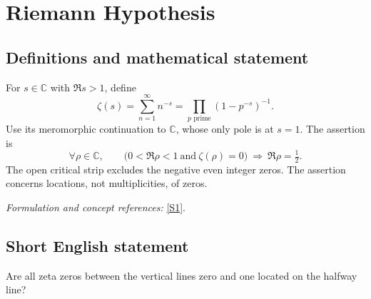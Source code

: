 \documentclass[11pt]{article}
\newcommand{\C}{\mathbb{C}}
\newcommand{\sref}[2]{\hyperlink{source:#1:#2}{[S#2]}}
\newif\ifshowcatalogue
\newcommand{\cataloguescope}[1]{\ifshowcatalogue
 \paragraph{Exact scope in the supplied catalogue.}
 \begin{quote}\small #1\end{quote}\fi}
\begin{document}
\setcounter{section}{1}
\clearpage
\section{\texorpdfstring{Riemann Hypothesis}{Riemann Hypothesis}}\label{2}
\subsection{Definitions and mathematical statement}
For $s\in\C$ with $\Re s>1$, define
\[
 \zeta(s)=\sum_{n=1}^{\infty}n^{-s}=\prod_{p\text{ prime}}(1-p^{-s})^{-1}.
\]
Use its meromorphic continuation to $\C$, whose only pole is at $s=1$. The assertion is
\[
 \forall\rho\in\C,\qquad \bigl(0<\Re\rho<1\ \text{and}\ \zeta(\rho)=0\bigr)
 \ \Longrightarrow\ \Re\rho=\tfrac12.
\]
The open critical strip excludes the negative even integer zeros. The assertion concerns locations, not multiplicities, of zeros.
\par\smallskip\textit{Formulation and concept references:} \sref{2}{1}.
\cataloguescope{For the meromorphic continuation of the Riemann zeta function zeta(s)=sum\_\{n>=1\} n\textasciicircum{}(-s), initially defined for Re(s)>1, every zero s in the open critical strip 0<Re(s)<1 has Re(s)=1/2. This is the Riemann Hypothesis for zeta alone; it does not assert simplicity of its zeros.}
\subsection{Short English statement}
Are all zeta zeros between the vertical lines zero and one located on the halfway line?
\end{document}
